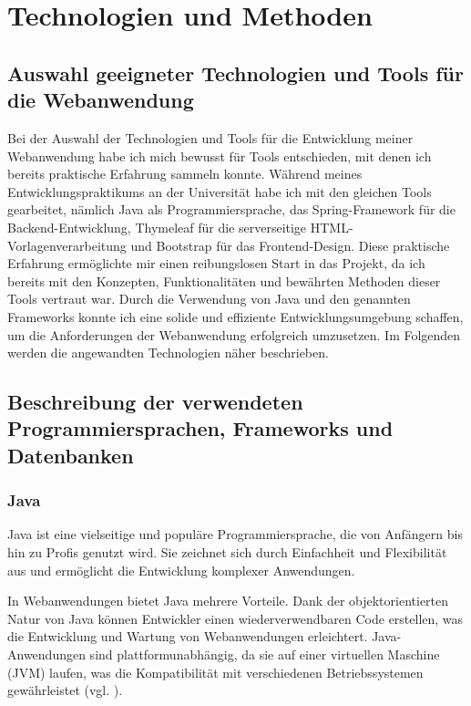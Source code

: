 \documentclass[fontsize=12pt,openright,oneside,paper=a4,BCOR=1cm]{scrbook}
\begin{document}
%
%
\renewcommand{\cleardoublepage}{}
\chapter{Technologien und Methoden}

\section{Auswahl geeigneter Technologien und Tools für die Webanwendung}
Bei der Auswahl der Technologien und Tools für die Entwicklung meiner Webanwendung habe ich mich bewusst für Tools entschieden, mit denen ich bereits praktische Erfahrung sammeln konnte. Während meines Entwicklungspraktikums an der Universität habe ich mit den gleichen Tools gearbeitet, nämlich Java als Programmiersprache, das Spring-Framework für die Backend-Entwicklung, Thymeleaf für die serverseitige HTML-Vorlagenverarbeitung und Bootstrap für das Frontend-Design. Diese praktische Erfahrung ermöglichte mir einen reibungslosen Start in das Projekt, da ich bereits mit den Konzepten, Funktionalitäten und bewährten Methoden dieser Tools vertraut war. Durch die Verwendung von Java und den genannten Frameworks konnte ich eine solide und effiziente Entwicklungsumgebung schaffen, um die Anforderungen der Webanwendung erfolgreich umzusetzen.
Im Folgenden werden die angewandten Technologien näher beschrieben.

\section{Beschreibung der verwendeten Programmiersprachen, Frameworks und Datenbanken}

\subsection{Java}
Java ist eine vielseitige und populäre Programmiersprache, die von Anfängern bis hin zu Profis genutzt wird. Sie zeichnet sich durch Einfachheit und Flexibilität aus und ermöglicht die Entwicklung komplexer Anwendungen.

In Webanwendungen bietet Java mehrere Vorteile. Dank der objektorientierten Natur von Java können Entwickler einen wiederverwendbaren Code erstellen, was die Entwicklung und Wartung von Webanwendungen erleichtert. Java-Anwendungen sind plattformunabhängig, da sie auf einer virtuellen Maschine (JVM) laufen, was die Kompatibilität mit verschiedenen Betriebssystemen gewährleistet (vgl. \cite{scalosoftjava}).
\end{document}

